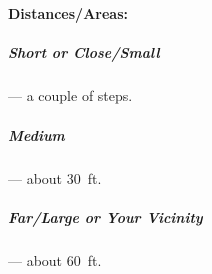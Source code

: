 \documentclass[itdr]{subfiles}
\begin{document}
\break

~\\
\begin{dbox}
	\paragraph{Distances/Areas:}
	\subparagraph{Short or Close/Small} --- a couple of steps.
	\subparagraph{Medium} --- about 30~ft.
	\subparagraph{Far/Large or Your Vicinity} --- about 60~ft.
\end{dbox}

\vfill


\vfill
\break
\end{document}
